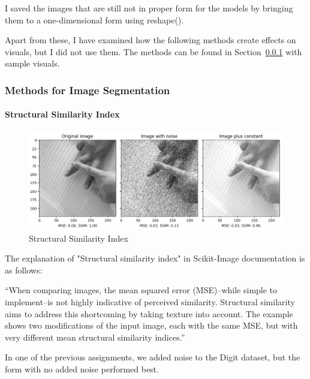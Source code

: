 \documentclass{article}
\begin{document}
\begin{flushleft}
I saved the images that are still not in proper form for the models by bringing them to a one-dimensional form using reshape().

Apart from these, I have examined how the following methods create effects on visuals, but I did not use them. The methods can be found in Section~\ref{methods} with sample visuals.

\subsubsection{Methods for Image Segmentation}
\label{methods}

\paragraph{Structural Similarity Index}
\begin{figure}[h]
    \centering
    \vspace{-5mm}
    \includegraphics[scale=0.4]{images/structural_similarity_index.png}
    \caption{Structural Similarity Index}
    \label{fig:structural_similarity_index}
\end{figure}

The explanation of "Structural similarity index" in Scikit-Image documentation is as follows:

``When comparing images, the mean squared error (MSE)–while simple to implement–is not highly indicative of perceived similarity. Structural similarity aims to address this shortcoming by taking texture into account. The example shows two modifications of the input image, each with the same MSE, but with very different mean structural similarity indices.''

In one of the previous assignments, we added noise to the Digit dataset, but the form with no added noise performed best.



\end{flushleft}
\end{document}
